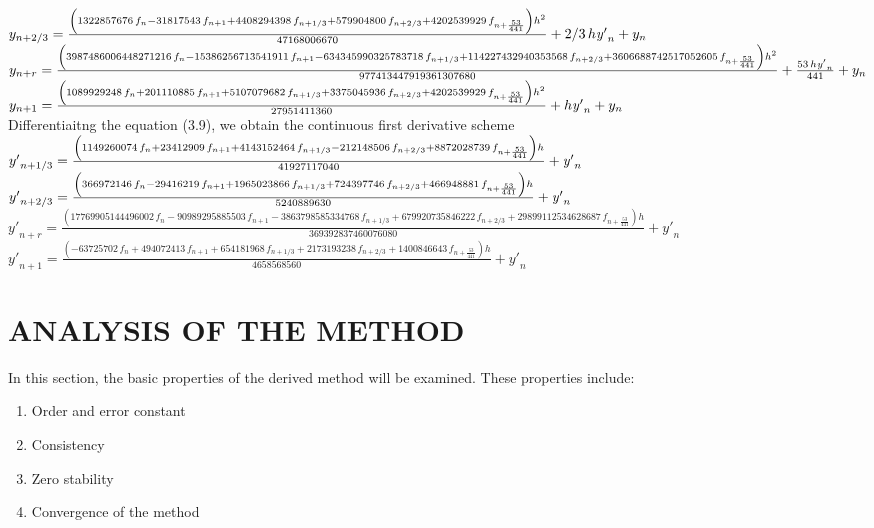 \documentclass[12pt]{report}
\begin{document}
$y_{{n+2/3}}={\frac { \left( 1322857676\,f_{{n}}-31817543\,f_{{n+1}}+
		4408294398\,f_{{n+1/3}}+579904800\,f_{{n+2/3}}+4202539929\,f_{{n+{
					\frac{53}{441}}}} \right) {h}^{2}}{47168006670}}+2/3\,h{\it y'}_{{n}}+
y_{{n}}
$\\

$y_{{n+r}}={\frac { \left( 3987486006448271216\,f_{{n}}-
		15386256713541911\,f_{{n+1}}-634345990325783718\,f_{{n+1/3}}+
		114227432940353568\,f_{{n+2/3}}+3606688742517052605\,f_{{n+{\frac{53}{
						441}}}} \right) {h}^{2}}{977413447919361307680}}+{\frac {53\,h{\it y'}
		_{{n}}}{441}}+y_{{n}}
$\\

$y_{{n+1}}={\frac { \left( 1089929248\,f_{{n}}+201110885\,f_{{n+1}}+
		5107079682\,f_{{n+1/3}}+3375045936\,f_{{n+2/3}}+4202539929\,f_{{n+{
					\frac{53}{441}}}} \right) {h}^{2}}{27951411360}}+h{\it y'}_{{n}}+y_{{n
}}
$\\

\noindent Differentiaitng the equation (3.9), we obtain the continuous first derivative scheme\\

${y'}_{{n+1/3}}={\frac{\left(1149260074\,f_{{n}}+23412909\,f_{{n+1}}+4143152464\,f_{{n+1/3}}-212148506\,f_{{n+2/3}}+8872028739\,f_{{n+{\frac{53}{441}}}}\right) h}{41927117040}}+{\it y'}_{{n}}$\\

${y'}_{{n+2/3}}={\frac{\left(366972146\,f_{{n}}-29416219\,f_{{n+1}}+1965023866\,f_{{n+1/3}}+724397746\,f_{{n+2/3}}+466948881\,f_{{n+{\frac{53}{441}}}} \right) h}{5240889630}}+{\it y'}_{{n}}$\\

${y'}_{n+r}={\frac{\left(17769905144496002\,f_{{n}}-90989295885503\,f_{{n+1}}-3863798585334768\,f_{{n+1/3}}+679920735846222\,f_{{n+2/3}}+29899112534628687\,f_{{n+{\frac{53}{441}}}}\right)h}{369392837460076080}}+{y'}_{{n}}$\\

${y'}_{{n+1}}={\frac{\left(-63725702\,f_{{n}}+494072413\,f_{{n+1}}+654181968\,f_{{n+1/3}}+2173193238\,f_{{n+2/3}}+1400846643\,f_{{n+{\frac{53}{441}}}}\right)h}{4658568560}}+{ y'}_{{n}}$



\section{ANALYSIS OF THE METHOD}
\noindent In this section, the basic properties of the derived method will be examined. These properties include:
\begin{enumerate}
	\item Order and error constant
	\item Consistency
	\item Zero stability 
	\item Convergence of the method
\end{enumerate}
\end{document}
